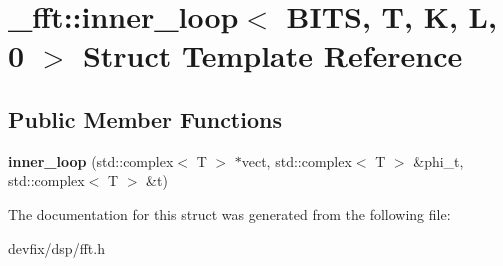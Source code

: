 \hypertarget{struct__fft_1_1inner__loop_3_01BITS_00_01T_00_01K_00_01L_00_010_01_4}{}\section{\+\_\+fft\+:\+:inner\+\_\+loop$<$ B\+I\+TS, T, K, L, 0 $>$ Struct Template Reference}
\label{struct__fft_1_1inner__loop_3_01BITS_00_01T_00_01K_00_01L_00_010_01_4}
\subsection*{Public Member Functions}
\begin{DoxyCompactItemize}
\item 
\mbox{\label{struct__fft_1_1inner__loop_3_01BITS_00_01T_00_01K_00_01L_00_010_01_4_a6d60ab833b554b5c78aaa7d8eb44e557}} 
{\bfseries inner\+\_\+loop} (std\+::complex$<$ T $>$ $\ast$vect, std\+::complex$<$ T $>$ \&phi\+\_\+t, std\+::complex$<$ T $>$ \&t)
\end{DoxyCompactItemize}


The documentation for this struct was generated from the following file\+:\begin{DoxyCompactItemize}
\item 
devfix/dsp/fft.\+h\end{DoxyCompactItemize}
